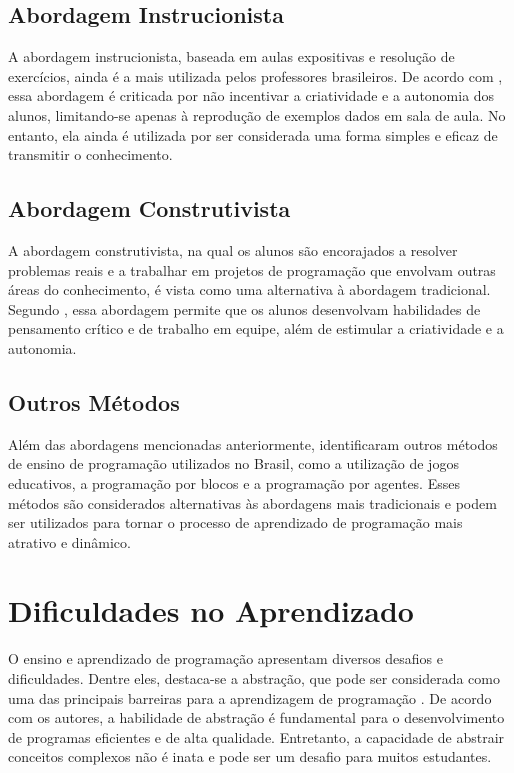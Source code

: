 \subsection{Abordagem Instrucionista}

A abordagem instrucionista, baseada em aulas expositivas e resolução de exercícios, ainda é a mais utilizada pelos professores brasileiros. De acordo com , essa abordagem é criticada por não incentivar a criatividade e a autonomia dos alunos, limitando-se apenas à reprodução de exemplos dados em sala de aula. No entanto, ela ainda é utilizada por ser considerada uma forma simples e eficaz de transmitir o conhecimento.

\subsection{Abordagem Construtivista}

A abordagem construtivista, na qual os alunos são encorajados a resolver problemas reais e a trabalhar em projetos de programação que envolvam outras áreas do conhecimento, é vista como uma alternativa à abordagem tradicional. Segundo , essa abordagem permite que os alunos desenvolvam habilidades de pensamento crítico e de trabalho em equipe, além de estimular a criatividade e a autonomia.

\subsection{Outros Métodos}

Além das abordagens mencionadas anteriormente,  identificaram outros métodos de ensino de programação utilizados no Brasil, como a utilização de jogos educativos, a programação por blocos e a programação por agentes. Esses métodos são considerados alternativas às abordagens mais tradicionais e podem ser utilizados para tornar o processo de aprendizado de programação mais atrativo e dinâmico.


\section{Dificuldades no Aprendizado}

O ensino e aprendizado de programação apresentam diversos desafios e dificuldades. Dentre eles, destaca-se a abstração, que pode ser considerada como uma das principais barreiras para a aprendizagem de programação \cite{Silva2014}. De acordo com os autores, a habilidade de abstração é fundamental para o desenvolvimento de programas eficientes e de alta qualidade. Entretanto, a capacidade de abstrair conceitos complexos não é inata e pode ser um desafio para muitos estudantes.

